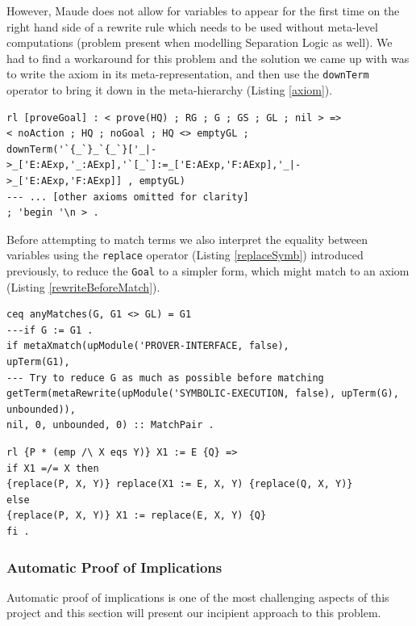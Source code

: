 \documentclass[12pt,a4paper]{article}
\begin{document}
	
	However, Maude does not allow for variables to appear for the first time on the right hand side of a rewrite rule which needs to be used without meta-level computations (problem present when modelling Separation Logic as well). We had to find a workaround for this problem and the solution we came up with was to write the axiom in its meta-representation, and then use the \texttt{downTerm} operator to bring it down in the meta-hierarchy (Listing \ref{axiom}).
	
	\begin{lstlisting}[label=axiom,caption=Initialization of Prover state]
rl [proveGoal] : < prove(HQ) ; RG ; G ; GS ; GL ; nil > =>
< noAction ; HQ ; noGoal ; HQ <> emptyGL ; 
downTerm('`{_`}_`{_`}['_|->_['E:AExp,'_:AExp],'`[_`]:=_['E:AExp,'F:AExp],'_|->_['E:AExp,'F:AExp]] , emptyGL)
--- ... [other axioms omitted for clarity] 
; 'begin '\n > .\end{lstlisting}
Before attempting to match terms we also interpret the equality between variables using the \texttt{replace} operator (Listing \ref{replaceSymb}) introduced previously, to reduce the \texttt{Goal} to a simpler form, which might match to an axiom (Listing \ref{rewriteBeforeMatch}).
	\begin{lstlisting}[caption=Equation reducing the goal before attempting to match it,label=rewriteBeforeMatch]
ceq anyMatches(G, G1 <> GL) = G1
---if G := G1 .
if metaXmatch(upModule('PROVER-INTERFACE, false), 
upTerm(G1),
--- Try to reduce G as much as possible before matching
getTerm(metaRewrite(upModule('SYMBOLIC-EXECUTION, false), upTerm(G), unbounded)),
nil, 0, unbounded, 0) :: MatchPair .
	\end{lstlisting} 
	\begin{lstlisting}[caption=Rule intepreting variable equality,label=replaceSymb]
rl {P * (emp /\ X eqs Y)} X1 := E {Q} =>  
if X1 =/= X then 
{replace(P, X, Y)} replace(X1 := E, X, Y) {replace(Q, X, Y)}
else 
{replace(P, X, Y)} X1 := replace(E, X, Y) {Q}
fi .\end{lstlisting}

\subsubsection{Automatic Proof of Implications}
\label{autoImpl}
Automatic proof of implications is one of the most challenging aspects of this project and this section will present our incipient approach to this problem.
\end{document}
